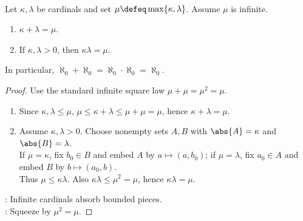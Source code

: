 \begin{theorem} \label{thm:infinite-cardinal-absorption-reference} \\
Let $\kappa,\lambda$ be cardinals and set $\mu\defeq\max\{\kappa,\lambda\}$. Assume $\mu$ is infinite.
\begin{enumerate}[label=(\roman*)]
\setlength{\itemsep}{0pt}
\item $\kappa+\lambda=\mu$.
\item If $\kappa,\lambda>0$, then $\kappa\lambda=\mu$.
\end{enumerate}
In particular, $\aleph_0+\aleph_0=\aleph_0\cdot\aleph_0=\aleph_0$.
\begin{proof}
Use the standard infinite square law $\mu+\mu=\mu^2=\mu$.
\begin{enumerate}[label=(\roman*)]
\setlength{\itemsep}{0pt}
\item Since $\kappa,\lambda\leq\mu$, $\mu\leq\kappa+\lambda\leq\mu+\mu=\mu$, hence $\kappa+\lambda=\mu$.
\item Assume $\kappa,\lambda>0$. Choose nonempty sets $A,B$ with $\abs{A}=\kappa$ and $\abs{B}=\lambda$.\\
If $\mu=\kappa$, fix $b_0\in B$ and embed $A$ by $a\mapsto(a,b_0)$; if $\mu=\lambda$, fix $a_0\in A$ and embed $B$ by $b\mapsto(a_0,b)$.\\
Thus $\mu\leq\kappa\lambda$. Also $\kappa\lambda\leq\mu^2=\mu$, hence $\kappa\lambda=\mu$.
\end{enumerate}
: Infinite cardinals absorb bounded pieces.\\
: Squeeze by $\mu^2=\mu$.
\end{proof}
\end{theorem}
